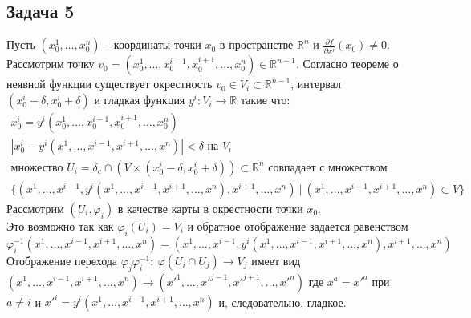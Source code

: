 \newpage
\subsection*{Задача 5}
	Пусть $(x_0^1, \ldots, x_0^n)$ -- координаты точки $x_0$ в пространстве $\mathbb{R}^n$ и $\frac{\partial f}{\partial x^i}(x_0) \ne 0$. Рассмотрим точку $v_0 = (x_0^1, \ldots, x_0^{i-1}, x_0^{i+1}, \ldots, x_0^{n}) \in \mathbb{R}^{n-1}$. Согласно теореме о неявной функции существует окрестность $v_0 \in V_i \subset \mathbb{R}^{n-1}$, интервал $(x_0^{i} - \delta, x_0^{i} + \delta)$ и гладкая функция $y^{i}: V_{i} \to \mathbb{R}$ такие что:
	\begin{gather*}
		x_0^{i} = y^i (x_0^{1}, \ldots, x_0^{i-1}, x_0^{i+1}, \ldots, x_0^{n})\\
		|x_0^{i} - y^i(x^1, \ldots, x^{i-1}, x^{i+1}, \ldots, x^n)| < \delta \text{ на } V_i\\
		\text{множество } U_i = \delta_c \cap (V \times (x_0^{i} - \delta, x_0^{i} + \delta)) \subset \mathbb{R}^n \text{ совпадает с множеством }\\ \{(x^{1}, \ldots, x^{i-1}, y^i(x^1, \ldots, x^{i-1}, x^{i+1}, \ldots, x^{n}), x^{i+1}, \ldots, x^{n})\ |\ (x^{1}, \ldots, x^{i-1}, x^{i+1}, \ldots, x^{n}) \subset V\}
	\end{gather*}
	Рассмотрим $(U_i, \varphi_i)$ в качестве карты в окрестности точки $x_0$.\\
	Это возможно так как $\varphi_i(U_i) = V_i$ и обратное отображение задается равенством $\varphi_i^{-1}(x^{1}, \ldots, x^{i-1}, x^{i+1}, \ldots, x^{n}) = (x^{1}, \ldots, x^{i-1}, y^i(x^{1}, \ldots, x^{i-1}, x^{i+1}, \ldots, x^{n}), x^{i+1}, \ldots, x^{n})$\\
	Отображение перехода $\varphi_j \varphi_i^{-1}:\ \varphi(U_i \cap U_j) \to V_j$ имеет вид $(x^{1}, \ldots, x^{i-1}, x^{i+1}, \ldots, x^{n}) \to ({x'}^{1}, \ldots, {x'}^{j-1}, {x'}^{j+1}, \ldots, {x'}^{n})$ где $x^{a} = x'^{a}$ при $a \ne i$ и ${x'}^{i} = y^{i}(x^{1}, \ldots, x^{i-1}, x^{i+1}, \ldots, x^{n})$ и, следовательно, гладкое.


